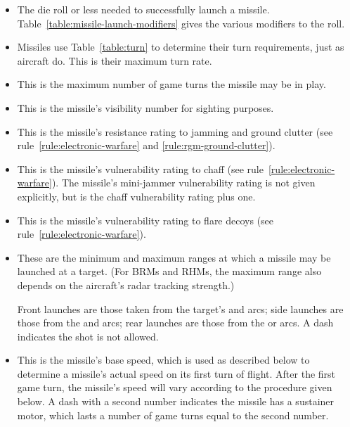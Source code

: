 {\begin{itemize}
    \item {} The die roll or less needed to successfully launch a missile. Table~\ref{table:missile-launch-modifiers} gives the various modifiers to the roll.

    \item {} Missiles use Table~\ref{table:turn} to determine their turn requirements, just as aircraft do. This is their maximum turn rate.

    \item {} This is the maximum number of game turns the missile may be in play.

    \item {} This is the missile’s visibility number for sighting purposes.

    \item {} This is the missile’s resistance rating to jamming and ground clutter (see rule~\ref{rule:electronic-warfare} and \ref{rule:rgm-ground-clutter}).

    \item {} This is the missile’s vulnerability rating to chaff (see rule~\ref{rule:electronic-warfare}). The missile’s mini-jammer vulnerability rating is not given explicitly, but is the chaff vulnerability rating plus one.

    \item {} This is the missile’s vulnerability rating to flare decoys (see rule~\ref{rule:electronic-warfare}).

    \item {} These are the minimum and maximum ranges at which a missile may be launched at a target. (For BRMs and RHMs, the maximum range also depends on the aircraft’s radar tracking strength.)

    Front launches are those taken from the target’s  and  arcs; side launches are those from the  and  arcs; rear launches are those from the  or  arcs. A dash indicates the shot is not allowed.

    \item {} This is the missile’s base speed, which is used as described below to determine a missile’s actual speed on its first turn of flight. After the first game turn, the missile’s speed will vary according to the procedure given below. A dash with a second number indicates the missile has a sustainer motor, which lasts a number of game turns equal to the second number.


\end{itemize}}
